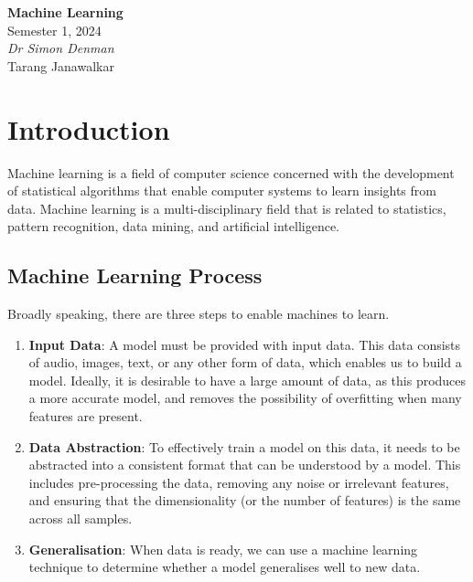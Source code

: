 \documentclass{article}
\date{}
\newcommand{\unitName}{Machine Learning}
\newcommand{\unitTime}{Semester 1, 2024}
\newcommand{\unitCoordinator}{Dr Simon Denman}
\newcommand{\documentAuthors}{Tarang Janawalkar}
\begin{document}
%
\begin{titlepage}
    \vspace*{\fill}
    \begin{center}
        \LARGE{\textbf{\unitName}} \\[0.1in]
        \normalsize{\unitTime} \\[0.2in]
        \normalsize\textit{\unitCoordinator} \\[0.2in]
        \documentAuthors
    \end{center}
    \vspace*{\fill}
    \doclicenseThis
    \thispagestyle{empty}
\end{titlepage}
\newpage
%
\tableofcontents
\newpage
%
\section{Introduction}
Machine learning is a field of computer science concerned with the
development of statistical algorithms that enable computer systems to
learn insights from data. Machine learning is a multi-disciplinary
field that is related to statistics, pattern recognition, data mining,
and artificial intelligence.
\subsection{Machine Learning Process}
Broadly speaking, there are three steps to enable machines to learn.
\begin{enumerate}
    \item \textbf{Input Data}: A model must be provided with input data.
          This data consists of audio, images, text, or any other form
          of data, which enables us to build a model. Ideally, it
          is desirable to have a large amount of data, as this produces
          a more accurate model, and removes the possibility of
          overfitting when many features are present.
    \item \textbf{Data Abstraction}: To effectively train a model on
          this data, it needs to be abstracted into a consistent format
          that can be understood by a model. This includes
          pre-processing the data, removing any noise or irrelevant
          features, and ensuring that the dimensionality (or the number
          of features) is the same across all samples.
    \item \textbf{Generalisation}: When data is ready, we can use a
          machine learning technique to determine whether a model
          generalises well to new data.
\end{enumerate}
\end{document}
